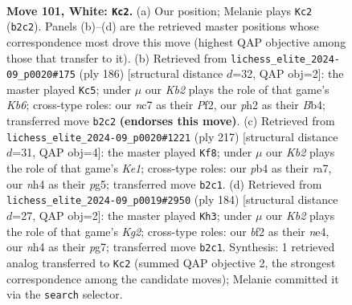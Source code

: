 \documentclass[11pt]{article}
\begin{document}
\clearpage

\begin{figure}[p]\centering
\begin{subfigure}{0.46\textwidth}\centering
\resizebox{\linewidth}{!}{%
\newchessgame
\chessboard[
  setfen={8/1Nn3k1/8/8/Pp2P2n/1B2p3/1K3b1p/8 w - - 10 101},
  showmover=false,
  pgfstyle=straightmove, color=movearrow, markmove={b2-c2}
]}
\caption{}
\end{subfigure}\hfill
\begin{subfigure}{0.46\textwidth}\centering
\resizebox{\linewidth}{!}{%
\newchessgame
\chessboard[
  setfen={8/3k4/PK4p1/7p/1BP1b2P/5p2/5P2/8 w - - 57 94},
  showmover=false,
  pgfstyle=straightmove, color=movearrow, markmove={b6-c5}
]}
\caption{}
\end{subfigure}
\\[4pt]
\begin{subfigure}{0.46\textwidth}\centering
\resizebox{\linewidth}{!}{%
\newchessgame
\chessboard[
  setfen={4k3/R7/5Bp1/2K1P1P1/p4p2/1b6/8/8 b - - 1 109},
  showmover=false,
  pgfstyle=straightmove, color=movearrow, markmove={e8-f8}
]}
\caption{}
\end{subfigure}\hfill
\begin{subfigure}{0.46\textwidth}\centering
\resizebox{\linewidth}{!}{%
\newchessgame
\chessboard[
  setfen={8/4k1p1/8/5p1P/2P1nP2/1n2B3/6K1/8 w - - 3 93},
  showmover=false,
  pgfstyle=straightmove, color=movearrow, markmove={g2-h3}
]}
\caption{}
\end{subfigure}
\caption{\textbf{Move 101, White: \texttt{Kc2}.} (a) Our position; Melanie plays \texttt{Kc2} (\texttt{b2c2}). Panels (b)--(d) are the retrieved master positions whose correspondence most drove this move (highest QAP objective among those that transfer to it). (b) Retrieved from \texttt{lichess\_elite\_2024-09\_p0020\#175} (ply 186) [structural distance $d$=32, QAP obj=2]: the master played \texttt{Kc5}; under $\mu$ our \emph{Kb2} plays the role of that game's \emph{Kb6}; cross-type roles: our \emph{n}c7 as their \emph{P}f2, our \emph{p}h2 as their \emph{B}b4; transferred move \texttt{b2c2} \textbf{(endorses this move)}. (c) Retrieved from \texttt{lichess\_elite\_2024-09\_p0020\#1221} (ply 217) [structural distance $d$=31, QAP obj=4]: the master played \texttt{Kf8}; under $\mu$ our \emph{Kb2} plays the role of that game's \emph{Ke1}; cross-type roles: our \emph{p}b4 as their \emph{r}a7, our \emph{n}h4 as their \emph{p}g5; transferred move \texttt{b2c1}. (d) Retrieved from \texttt{lichess\_elite\_2024-09\_p0019\#2950} (ply 184) [structural distance $d$=27, QAP obj=2]: the master played \texttt{Kh3}; under $\mu$ our \emph{Kb2} plays the role of that game's \emph{Kg2}; cross-type roles: our \emph{b}f2 as their \emph{n}e4, our \emph{n}h4 as their \emph{p}g7; transferred move \texttt{b2c1}. Synthesis: 1 retrieved analog transferred to \texttt{Kc2} (summed QAP objective 2, the strongest correspondence among the candidate moves); Melanie committed it via the \texttt{search} selector.}
\label{fig:thought-m200}
\end{figure}
\end{document}
